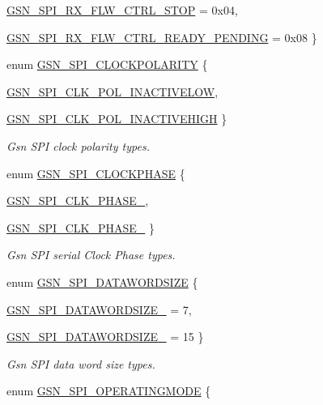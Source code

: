 \begin{DoxyCompactItemize}
\par
\hyperlink{a00587_ad34f711f03e3ba0055566119931ebfa6ad1575897e2aa42d6d7685e88d935aa97}{GSN\_\-SPI\_\-RX\_\-FLW\_\-CTRL\_\-STOP} =  0x04, 
\par
\hyperlink{a00587_ad34f711f03e3ba0055566119931ebfa6a1ee1ef11291783a59b3dd7ef78ac3a57}{GSN\_\-SPI\_\-RX\_\-FLW\_\-CTRL\_\-READY\_\-PENDING} =  0x08
 \}
\item 
enum \hyperlink{a00655_ga6d27ddbf02c08f4f80f88328bb907f94}{GSN\_\-SPI\_\-CLOCKPOLARITY} \{ \par
\hyperlink{a00655_gga6d27ddbf02c08f4f80f88328bb907f94ab175071e88453ab1b63abe5db3500175}{GSN\_\-SPI\_\-CLK\_\-POL\_\-INACTIVELOW}, 
\par
\hyperlink{a00655_gga6d27ddbf02c08f4f80f88328bb907f94af27b1c22561eb85366ce7e10e0d9e7f5}{GSN\_\-SPI\_\-CLK\_\-POL\_\-INACTIVEHIGH}
 \}
\begin{DoxyCompactList}\small\item\em Gsn SPI clock polarity types. \end{DoxyCompactList}\item 
enum \hyperlink{a00655_gad25e484c9005210b7db2528764be5034}{GSN\_\-SPI\_\-CLOCKPHASE} \{ \par
\hyperlink{a00655_ggad25e484c9005210b7db2528764be5034aab08aff0047af6002867e4d4395f9e86}{GSN\_\-SPI\_\-CLK\_\-PHASE\_}, 
\par
\hyperlink{a00655_ggad25e484c9005210b7db2528764be5034ae00df0dc7e8ab0bb7af357af893ed703}{GSN\_\-SPI\_\-CLK\_\-PHASE\_}
 \}
\begin{DoxyCompactList}\small\item\em Gsn SPI serial Clock Phase types. \end{DoxyCompactList}\item 
enum \hyperlink{a00655_ga52e3e63232981dd9e13226ef140541bf}{GSN\_\-SPI\_\-DATAWORDSIZE} \{ \par
\hyperlink{a00655_gga52e3e63232981dd9e13226ef140541bfa1e0f6a3003be36a5ace865cee8d34085}{GSN\_\-SPI\_\-DATAWORDSIZE\_} =  7, 
\par
\hyperlink{a00655_gga52e3e63232981dd9e13226ef140541bfa22e72ad895b04d78a53fa2ffba6baa57}{GSN\_\-SPI\_\-DATAWORDSIZE\_} =  15
 \}
\begin{DoxyCompactList}\small\item\em Gsn SPI data word size types. \end{DoxyCompactList}\item 
enum \hyperlink{a00655_ga4b04f6b757fd4a767ea05de3de79ad15}{GSN\_\-SPI\_\-OPERATINGMODE} \{ \par

\end{DoxyCompactItemize}
